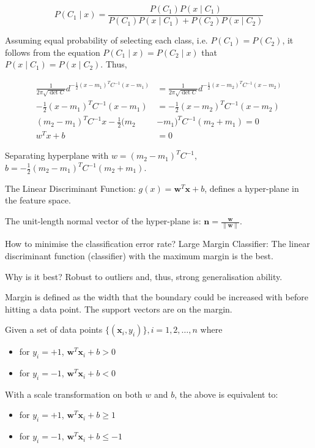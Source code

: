 $$
P(C_1 \mid x) = \frac{P(C_1) P(x \mid C_1)}{P(C_1) P(x \mid C_1) + P(C_2) P(x \mid C_2)}
$$

Assuming equal probability of selecting each class, i.e. $P(C_1) = P(C_2)$, it follows
from the equation $P(C_1 \mid x) = P(C_2 \mid x)$ that $P(x \mid C_1) = P(x \mid C_2)$. Thus,

\begin{align*}
    \frac{1}{2 \pi \sqrt{\det{C}}} d^{-\frac{1}{2} (x - m_1)^T C^{-1} (x - m_1)}
    & = \frac{1}{2 \pi \sqrt{\det{C}}} d^{-\frac{1}{2} (x - m_2)^T C^{-1} (x - m_2)} \\
    - \frac{1}{2} (x - m_1)^T C^{-1}(x - m_1) & = - \frac{1}{2} (x - m_2)^T C^{-1}(x - m_2) \\
    (m_2 - m_1)^T C^{-1} x - \frac{1}{2} (m_2 & - m_1)^T C^{-1} (m_2 + m_1) = 0 \\
    w^T x + b & = 0
\end{align*}

Separating hyperplane with $w = (m_2 - m_1)^T C^{-1}$,
$b = - \frac{1}{2} (m_2 - m_1)^T C^{-1} (m_2 + m_1)$.

The Linear Discriminant Function: $g(x) = \bm{w}^T \bm{x} + b$, defines a hyper-plane in the feature space.

The unit-length normal vector of the hyper-plane is: $\bm{n} = \frac{\bm{w}}{\lVert \bm{w} \rVert}$.

How to minimise the classification error rate? Large Margin Classifier:
The linear discriminant function (classifier) with the maximum margin is the best.

Why is it best? Robust to outliers and, thus, strong generalisation ability.

Margin is defined as the width that the boundary could be increased with before hitting a data point.
The support vectors are on the margin.

Given a set of data points $\{ (\bm{x}_i, y_i) \}, i = 1, 2, \dots, n$ where

\begin{itemize}
    \item for $y_i = +1$, $\bm{w}^T \bm{x}_i + b > 0$
    \item for $y_i = -1$, $\bm{w}^T \bm{x}_i + b < 0$
\end{itemize}

With a scale transformation on both $w$ and $b$, the above is equivalent to:

\begin{itemize}
    \item for $y_i = +1$, $\bm{w}^T \bm{x}_i + b \geq 1$
    \item for $y_i = -1$, $\bm{w}^T \bm{x}_i + b \leq -1$
\end{itemize}

